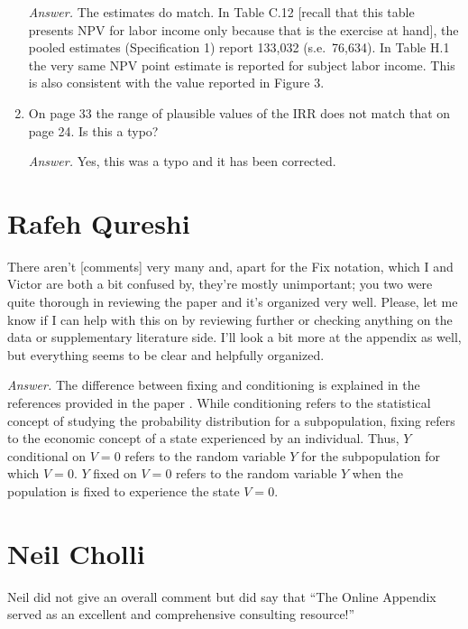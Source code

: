 \begin{enumerate}
\noindent \textit{Answer.} The estimates do match. In Table C.12 [recall that this table presents NPV for labor income only because that is the exercise at hand], the pooled estimates (Specification 1) report 133,032 (s.e.\ 76,634). In Table H.1 the very same NPV point estimate is reported for subject labor income. This is also consistent with the value reported in Figure 3. 

\item On page 33 the range of plausible values of the IRR does not match that on page 24. Is this a typo?

\noindent \textit{Answer.}  Yes, this was a typo and it has been corrected.
\end{enumerate}

\section*{Rafeh Qureshi}

There aren't [comments] very many and, apart for the Fix notation, which I and Victor are both a bit confused by, they're mostly unimportant; you two were quite thorough in reviewing the paper and it's organized very well. Please, let me know if I can help with this on by reviewing further or checking anything on the data or supplementary literature side. I'll look a bit more at the appendix as well, but everything seems to be clear and helpfully organized.

\textit{Answer.} The difference between fixing and conditioning is explained in the references provided in the paper \citep{Heckman_Pinto_2015_EconometTheory}. While conditioning refers to the statistical concept of studying the probability distribution for a subpopulation, fixing refers to the economic concept of a state experienced by an individual. Thus, $Y$ conditional on $V = 0$ refers to the random variable $Y$ for the subpopulation for which $V = 0$. $Y$ fixed on $V = 0$ refers to the random variable $Y$ when the population is fixed to experience the state $V = 0$.

\section*{Neil Cholli}

Neil did not give an overall comment but did say that ``The Online Appendix served as an excellent and comprehensive consulting resource!''

